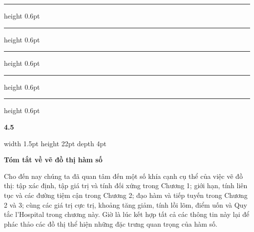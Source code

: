 \documentclass[10pt]{article}
\begin{document}
\noindent
{\small\bfseries{}}
\vspace{10pt}

\noindent
\begin{minipage}[c]{48mm}
  \begin{minipage}[c]{22mm}
    {\color{stewartblue!70}%
    \hrule height 0.6pt\vspace{2.5pt}%
    \hrule height 0.6pt\vspace{2.5pt}%
    \hrule height 0.6pt\vspace{2.5pt}%
    \hrule height 0.6pt\vspace{2.5pt}%
    \hrule height 0.6pt}%
  \end{minipage}\hfill
  {\fontsize{24}{26}\selectfont\bfseries\sffamily\color{stewartblue} 4.5}%
\end{minipage}%
\begin{minipage}[c]{6mm}
  \centering
  {\color{stewartblue}\vrule width 1.5pt height 22pt depth 4pt}
\end{minipage}%
\begin{minipage}[c]{126mm}
  {\fontsize{17}{21}\selectfont\bfseries\sffamily Tóm tắt về vẽ đồ thị hàm số}
\end{minipage}

\vspace{10pt}

\noindent
\begin{minipage}[t]{48mm}
  \mbox{}
\end{minipage}\hfill
\begin{minipage}[t]{126mm}
  Cho đến nay chúng ta đã quan tâm đến một số khía cạnh cụ thể của việc vẽ đồ thị: tập xác định, tập giá trị và tính đối xứng trong Chương 1; giới hạn, tính liên tục và các đường tiệm cận trong Chương 2; đạo hàm và tiếp tuyến trong Chương 2 và 3; cùng các giá trị cực trị, khoảng tăng giảm, tính lồi lõm, điểm uốn và Quy tắc l'Hospital trong chương này. Giờ là lúc kết hợp tất cả các thông tin này lại để phác thảo các đồ thị thể hiện những đặc trưng quan trọng của hàm số.
\end{minipage}

\vspace{8pt}
\end{document}
